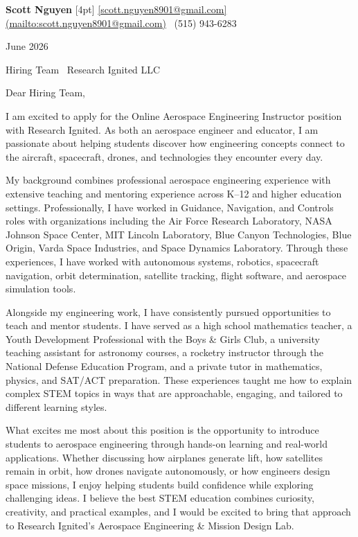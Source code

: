 \documentclass[11pt]{article}
\begin{document}
	
	\begin{center}
		{\Large\bfseries\color{mygreen} Scott Nguyen} [4pt]
		\href{mailto:scott[.nguyen8901@gmail.com](mailto:.nguyen8901@gmail.com)}{[scott.nguyen8901@gmail.com](mailto:scott.nguyen8901@gmail.com)} \textbar\ (515) 943-6283
	\end{center}
	
	\vspace{0.2in}
	
	June 2026
	
	Hiring Team \
	Research Ignited LLC
	
	\vspace{0.1in}
	
	Dear Hiring Team,
	
	I am excited to apply for the Online Aerospace Engineering Instructor position with Research Ignited. As both an aerospace engineer and educator, I am passionate about helping students discover how engineering concepts connect to the aircraft, spacecraft, drones, and technologies they encounter every day.
	
	My background combines professional aerospace engineering experience with extensive teaching and mentoring experience across K--12 and higher education settings. Professionally, I have worked in Guidance, Navigation, and Controls roles with organizations including the Air Force Research Laboratory, NASA Johnson Space Center, MIT Lincoln Laboratory, Blue Canyon Technologies, Blue Origin, Varda Space Industries, and Space Dynamics Laboratory. Through these experiences, I have worked with autonomous systems, robotics, spacecraft navigation, orbit determination, satellite tracking, flight software, and aerospace simulation tools.
	
	Alongside my engineering work, I have consistently pursued opportunities to teach and mentor students. I have served as a high school mathematics teacher, a Youth Development Professional with the Boys \& Girls Club, a university teaching assistant for astronomy courses, a rocketry instructor through the National Defense Education Program, and a private tutor in mathematics, physics, and SAT/ACT preparation. These experiences taught me how to explain complex STEM topics in ways that are approachable, engaging, and tailored to different learning styles.
	
	What excites me most about this position is the opportunity to introduce students to aerospace engineering through hands-on learning and real-world applications. Whether discussing how airplanes generate lift, how satellites remain in orbit, how drones navigate autonomously, or how engineers design space missions, I enjoy helping students build confidence while exploring challenging ideas. I believe the best STEM education combines curiosity, creativity, and practical examples, and I would be excited to bring that approach to Research Ignited's Aerospace Engineering \& Mission Design Lab.
	
\end{document}
